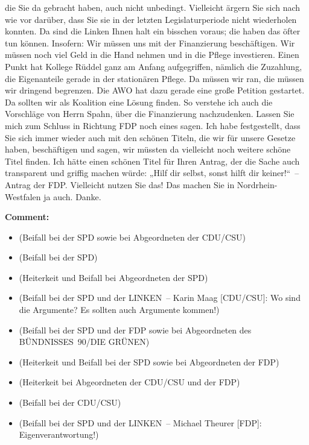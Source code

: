 \documentclass{article}
\begin{document}
die Sie da gebracht haben, auch nicht unbedingt. Vielleicht ärgern Sie sich nach wie vor darüber, dass Sie sie in der letzten Legislaturperiode nicht wiederholen konnten. Da sind die Linken Ihnen halt ein bisschen voraus; die haben das öfter tun können.  Insofern: Wir müssen uns mit der Finanzierung beschäftigen. Wir müssen noch viel Geld in die Hand nehmen und in die Pflege investieren. Einen Punkt hat Kollege Rüddel ganz am Anfang aufgegriffen, nämlich die Zuzahlung, die Eigenanteile gerade in der stationären Pflege. Da müssen wir ran, die müssen wir dringend begrenzen. Die AWO hat dazu gerade eine große Petition gestartet. Da sollten wir als Koalition eine Lösung finden. So verstehe ich auch die Vorschläge von Herrn Spahn, über die Finanzierung nachzudenken. Lassen Sie mich zum Schluss in Richtung FDP noch eines sagen. Ich habe festgestellt, dass Sie sich immer wieder auch mit den schönen Titeln, die wir für unsere Gesetze haben, beschäftigen und sagen, wir müssten da vielleicht noch weitere schöne Titel finden. Ich hätte einen schönen Titel für Ihren Antrag, der die Sache auch transparent und griffig machen würde: „Hilf dir selbst, sonst hilft dir keiner!“ – Antrag der FDP. Vielleicht nutzen Sie das! Das machen Sie in Nordrhein-Westfalen ja auch. Danke.  

\noindent\textbf{Comment:}
\begin{itemize}
    \setlength\itemsep{-3pt}
    \item (Beifall bei der SPD sowie bei Abgeordneten der CDU/CSU)
    \setlength\itemsep{-3pt}
    \item (Beifall bei der SPD)
    \setlength\itemsep{-3pt}
    \item (Heiterkeit und Beifall bei Abgeordneten der SPD)
    \setlength\itemsep{-3pt}
    \item (Beifall bei der SPD und der LINKEN – Karin Maag [CDU/CSU]: Wo sind die Argumente? Es sollten auch Argumente kommen!)
    \setlength\itemsep{-3pt}
    \item (Beifall bei der SPD und der FDP sowie bei Abgeordneten des BÜNDNISSES 90/DIE GRÜNEN)
    \setlength\itemsep{-3pt}
    \item (Heiterkeit und Beifall bei der SPD sowie bei Abgeordneten der FDP)
    \setlength\itemsep{-3pt}
    \item (Heiterkeit bei Abgeordneten der CDU/CSU und der FDP)
    \setlength\itemsep{-3pt}
    \item (Beifall bei der CDU/CSU)
    \setlength\itemsep{-3pt}
    \item (Beifall bei der SPD und der LINKEN – Michael Theurer [FDP]: Eigenverantwortung!)
\end{itemize}
\end{document}

